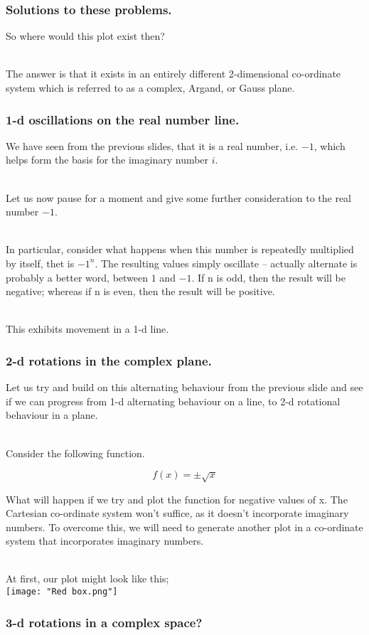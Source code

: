 %
%

\begin{frame}
\frametitle{Solutions to these problems.}

So where would this plot exist then?\\~\

The answer is that it exists in an entirely different 2-dimensional co-ordinate system which is referred to as a complex, Argand, or Gauss plane.

\end{frame}


%
%

\begin{frame}
\frametitle{1-d oscillations on the real number line.}

We have seen from the previous slides, that it is a real number, i.e. \(-1\), which helps form the basis for the imaginary number \(i\).\\~\

Let us now pause for a moment and give some further consideration to the real number \(-1\).\\~\

In particular, consider what happens when this number is repeatedly multiplied by itself, thet is \(-1^{n}\). The resulting values simply
oscillate -- actually alternate is probably a better word, between \(1\) and \(-1\). If n is odd, then the result will be negative; whereas if n is even,
then the result will be positive.\\~\

This exhibits movement in a 1-d line.

\end{frame}


%
%

\begin{frame}
\frametitle{2-d rotations in the complex plane.}

Let us try and build on this alternating behaviour from the previous slide and see if we can progress from 1-d alternating behaviour on a line, to 2-d
rotational behaviour in a plane.\\~\

Consider the following function.

\begin{equation}
  f(x) = \pm\sqrt{x}
\end{equation}

What will happen if we try and plot the function for negative values of x. The Cartesian co-ordinate system won't suffice, as it doesn't incorporate
imaginary numbers. To overcome this, we will need to generate another plot in a co-ordinate system that incorporates imaginary numbers.\\~\

\end{frame}


%
%

\begin{frame}

At first, our plot might look like this;\\

\texttt{[image: "Red box.png"]}

\end{frame}


%
%

\begin{frame}
\frametitle{3-d rotations in a complex space?}

\end{frame}
